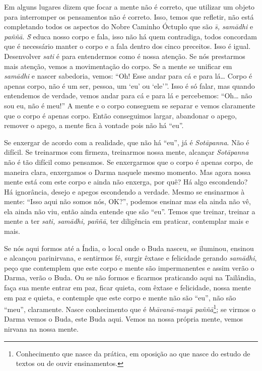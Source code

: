 Em alguns lugares dizem que focar a mente não é correto, que
utilizar um objeto para interromper os pensamentos não é correto. Isso,
temos que refletir, não está completando todos os aspectos do Nobre
Caminho Óctuplo que são \textit{s\=\ila, sam\=adhi }e\textit{ paññ\=a}.
\textit{S\=\ila} educa nosso corpo e fala, isso não há quem contradiga,
todos concordam que é necessário manter o corpo e a fala dentro dos
cinco preceitos. Isso é igual. Desenvolver \textit{sati} é para
entendermos como é nossa atenção. Se nós prestarmos mais atenção, vemos
a movimentação do corpo. Se a mente se unificar em \textit{sam\=adhi} e
nascer sabedoria, vemos: “Oh! Esse andar para cá e para lá… Corpo é
apenas corpo, não é um ser, pessoa, um ‘eu’ ou ‘ele’”. Isso é só falar,
mas quando entendemos de verdade, vemos andar para cá e para lá e
percebemos: “Oh… não sou eu, não é meu!” A mente e o corpo conseguem se
separar e vemos claramente que o corpo é apenas corpo. Então
conseguimos largar, abandonar o apego, remover o apego, a mente fica à
vontade pois não há “eu”. 

Se enxergar de acordo com a realidade, que não há “eu”, já é
\textit{Sot\=apanna}. Não é difícil. Se treinarmos com firmeza,
treinarmos nossa mente, alcançar \textit{Sot\=apanna} não é tão difícil
como pensamos. Se enxergarmos que o corpo é apenas corpo, de maneira
clara, enxergamos o Darma naquele mesmo momento. Mas agora nossa mente
está com este corpo e ainda não enxerga, por quê? Há algo escondendo?
Há ignorância, desejo e apegos escondendo a verdade. Mesmo se
ensinarmos à mente: “Isso aqui não somos nós, OK?”, podemos ensinar mas
ela ainda não vê, ela ainda não viu, então ainda entende que são “eu”.
Temos que treinar, treinar a mente a ter \textit{sati, sam\=adhi,
paññ\=a}, ter diligência em praticar, contemplar mais e mais. 

Se nós aqui formos até a Índia, o local onde o Buda nasceu, se
iluminou, ensinou e alcançou parinirvana, e sentirmos fé, surgir êxtase
e felicidade gerando \textit{sam\=adhi}, peço que contemplem que este
corpo e mente são impermanentes e assim verão o Darma, verão o Buda. Ou
se não formos e ficarmos praticando aqui na Tailândia, faça sua mente
entrar em paz, ficar quieta, com êxtase e felicidade, nossa mente em
paz e quieta, e contemple que este corpo e mente não são “eu”, não são
“meu”, claramente. Nasce conhecimento que é \textit{bh\=avan\=a-may\=a
paññ\=a}\footnote{Conhecimento que nasce da prática, em oposição ao que
nasce do estudo de textos ou de ouvir ensinamentos.}; se virmos o Darma
vemos o Buda, este Buda aqui. Vemos na nossa própria mente, vemos
nirvana na nossa mente. 

